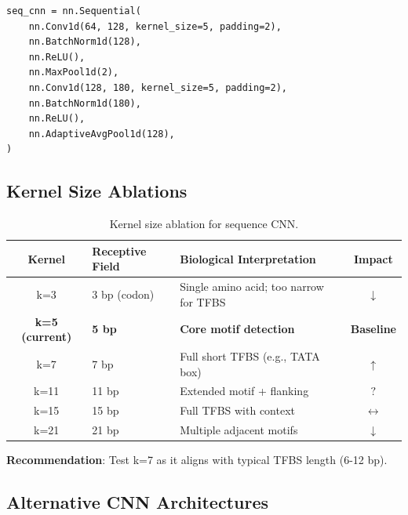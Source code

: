 \documentclass[11pt,a4paper]{article}
\begin{document}
\begin{verbatim}
seq_cnn = nn.Sequential(
    nn.Conv1d(64, 128, kernel_size=5, padding=2),
    nn.BatchNorm1d(128),
    nn.ReLU(),
    nn.MaxPool1d(2),
    nn.Conv1d(128, 180, kernel_size=5, padding=2),
    nn.BatchNorm1d(180),
    nn.ReLU(),
    nn.AdaptiveAvgPool1d(128),
)
\end{verbatim}

\subsection{Kernel Size Ablations}

\begin{table}[H]
\centering
\begin{tabular}{cL{4cm}L{4cm}c}
\toprule
\textbf{Kernel} & \textbf{Receptive Field} & \textbf{Biological Interpretation} & \textbf{Impact} \\
\midrule
k=3 & 3 bp (codon) & Single amino acid; too narrow for TFBS & \textcolor{negative}{$\downarrow$} \\
\textbf{k=5 (current)} & \textbf{5 bp} & \textbf{Core motif detection} & \textbf{Baseline} \\
k=7 & 7 bp & Full short TFBS (e.g., TATA box) & \textcolor{positive}{$\uparrow$} \\
k=11 & 11 bp & Extended motif + flanking & \textcolor{uncertain}{$?$} \\
k=15 & 15 bp & Full TFBS with context & \textcolor{neutral}{$\leftrightarrow$} \\
k=21 & 21 bp & Multiple adjacent motifs & \textcolor{negative}{$\downarrow$} \\
\bottomrule
\end{tabular}
\caption{Kernel size ablation for sequence CNN.}
\end{table}

\textbf{Recommendation}: Test k=7 as it aligns with typical TFBS length (6-12 bp).

\subsection{Alternative CNN Architectures}
\end{document}
